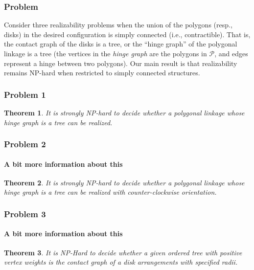 \documentclass{beamer}
\newtheorem{thm}{Theorem}
\renewcommand{\PP}{{\mathcal{P}}} %
\begin{document}
   \begin{frame}
    \frametitle{Problem}
	Consider three realizability problems when the union of the polygons 
	(resp., disks) in the desired configuration is simply connected (i.e., contractible). That is, the 
	contact graph of the disks is a tree, or the ``hinge graph'' of the polygonal linkage is a tree (the 
	vertices in the \emph{hinge graph} are the polygons in $\PP$, and edges represent a hinge between 
	two polygons). Our main result is that realizability remains NP-hard when restricted to simply 
	connected structures.
    \end{frame}

  \begin{frame}
    \frametitle{Problem 1}
    \begin{thm}\label{thm:hinge2}
	It is strongly NP-hard to decide whether a polygonal linkage whose hinge graph is a \textit{tree} can be realized.
	\end{thm}
  \end{frame}

  \begin{frame}
    \frametitle{Problem 2}
    \framesubtitle{A bit more information about this}
    \begin{thm}\label{thm:hinge3}
It is strongly NP-hard to decide whether a polygonal linkage whose hinge graph is a \textit{tree} can be realized with counter-clockwise orientation.
\end{thm}
  \end{frame}
  \begin{frame}
    \frametitle{Problem 3}
    \framesubtitle{A bit more information about this}
    \begin{thm}\label{thm:disk}
It is NP-Hard to decide whether a given ordered tree with positive vertex weights is the contact graph of a disk arrangements with specified radii.
\end{thm}



  \end{frame}
\end{document}
